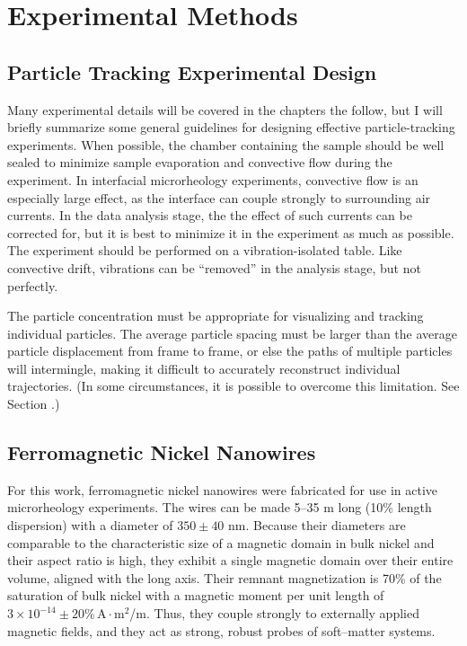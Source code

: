 \chapter{\label{chap:methods}Experimental Methods}

\section{Particle Tracking Experimental Design}

Many experimental details will be covered in the chapters the follow, but I will briefly summarize some general guidelines for designing effective particle-tracking experiments. When possible, the chamber containing the sample should be well sealed to minimize sample evaporation and convective flow during the experiment\cite{Savin2005}. In interfacial microrheology experiments, convective flow is an especially large effect, as the interface can couple strongly to surrounding air currents. In the data analysis stage, the the effect of such currents can be corrected for\cite{Crocker2007}, but it is best to minimize it in the experiment as much as possible. The experiment should be performed on a vibration-isolated table. Like convective drift, vibrations can be ``removed'' in the analysis stage, but not perfectly. 

The particle concentration must be appropriate for visualizing and tracking individual particles. The average particle spacing must be larger than the average particle displacement from frame to frame, or else the paths of multiple particles will intermingle, making it difficult to accurately reconstruct individual trajectories\cite{Crocker1996}. (In some circumstances, it is possible to overcome this limitation. See Section \label{sec:prediction}.)

\section{Ferromagnetic Nickel Nanowires}

For this work, ferromagnetic nickel nanowires were fabricated for use in active microrheology experiments. The wires can be made 5--35 \textmu m long (10\% length dispersion\cite{Hultgren2004,Hultgren2005}) with a diameter of $350 \pm 40$ nm\cite{Hultgren2004,Hultgren2005}. Because their diameters are comparable to the characteristic size of a magnetic domain in bulk nickel and their aspect ratio is high, they exhibit a single magnetic domain over their entire volume, aligned with the long axis. Their remnant magnetization is 70\% of the saturation of bulk nickel\cite{Sun1999} with a magnetic moment per unit length of $3 \times 10^{-14}\pm20\% \,\text{A}\cdot\text{m}^2$/\textmu m. Thus, they couple strongly to externally applied magnetic fields, and they act as strong, robust probes of soft--matter systems.

